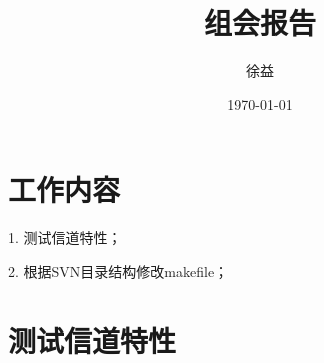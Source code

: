 \documentclass{article}
\title{组会报告}
\author{徐益}
\date{\today}
\begin{document}
\maketitle


\section{工作内容}
1. 测试信道特性；

2. 根据SVN目录结构修改makefile；

\section{测试信道特性}
\end{document}
